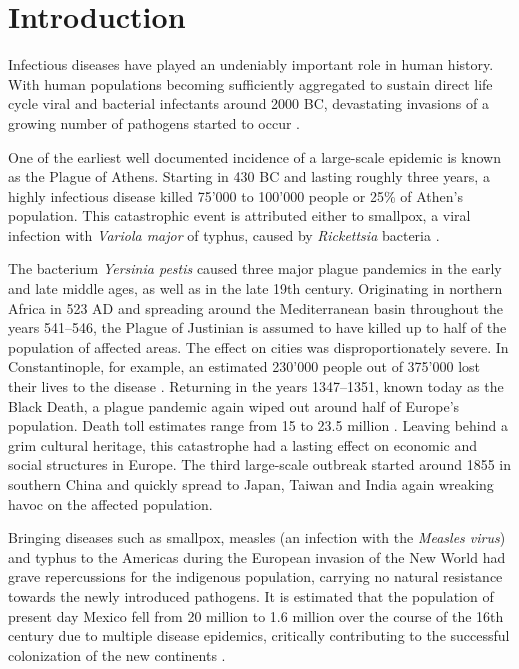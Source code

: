 \chapter{Introduction}



Infectious diseases have played an undeniably important role in human history. With human populations becoming sufficiently aggregated to sustain direct life cycle viral and bacterial infectants around 2000 BC, devastating invasions of a growing number of pathogens started to occur \citep{Dobson1996}.

One of the earliest well documented incidence of a large-scale epidemic is known as the Plague of Athens. Starting in 430 BC and lasting roughly three years, a highly infectious disease killed 75'000 to 100'000 people or 25\% of Athen's population. This catastrophic event is attributed either to smallpox, a viral infection with \textit{Variola major} of typhus, caused by \textit{Rickettsia} bacteria \citep{Littman2009}.

The bacterium \textit{Yersinia pestis} caused three major plague pandemics in the early and late middle ages, as well as in the late 19th century. Originating in northern Africa in 523 AD and spreading around the Mediterranean basin throughout the years 541--546, the Plague of Justinian is assumed to have killed up to half of the population of affected areas. The effect on cities was disproportionately severe. In Constantinople, for example, an estimated 230'000 people out of 375'000 lost their lives to the disease \citep{Treadgold1997}. Returning in the years 1347--1351, known today as the Black Death, a plague pandemic again wiped out around half of Europe's population. Death toll estimates range from 15 to 23.5 million \citep{Zietz2004}. Leaving behind a grim cultural heritage, this catastrophe had a lasting effect on economic and social structures in Europe. The third large-scale outbreak started around 1855 in southern China and quickly spread to Japan, Taiwan and India again wreaking havoc on the affected population.

Bringing diseases such as smallpox, measles (an infection with the \textit{Measles virus}) and typhus to the Americas during the European invasion of the New World had grave repercussions for the indigenous population, carrying no natural resistance towards the newly introduced pathogens. It is estimated that the population of present day Mexico fell from 20 million to 1.6 million over the course of the 16th century due to multiple disease epidemics, critically contributing to the successful colonization of the new continents \citep{Dobson1996}.

